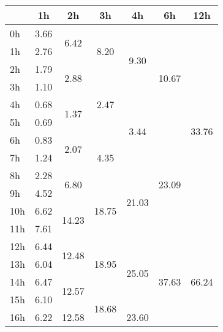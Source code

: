 \begin{center}
\begin{tabular}{l || c | c | c | c | c | c |}\hline
 & 1h & 2h & 3h & 4h & 6h & 12h \\\hline
0h & \multirow{1}{*}{ 3.66 }  & \multirow{2}{*}{ 6.42 }  & \multirow{3}{*}{ 8.20 }  & \multirow{4}{*}{ 9.30 }  & \multirow{6}{*}{ 10.67 }  & \multirow{12}{*}{ 33.76 }  \\\cline{1-1}
1h & \multirow{1}{*}{ 2.76 }  & & & & & \\\cline{1-1}\cline{2-2}
2h & \multirow{1}{*}{ 1.79 }  & \multirow{2}{*}{ 2.88 }  & & & & \\\cline{1-1}\cline{3-3}
3h & \multirow{1}{*}{ 1.10 }  & & \multirow{3}{*}{ 2.47 }  & & & \\\cline{1-1}\cline{2-2}\cline{4-4}
4h & \multirow{1}{*}{ 0.68 }  & \multirow{2}{*}{ 1.37 }  & & \multirow{4}{*}{ 3.44 }  & & \\\cline{1-1}
5h & \multirow{1}{*}{ 0.69 }  & & & & & \\\cline{1-1}\cline{2-2}\cline{3-3}\cline{5-5}
6h & \multirow{1}{*}{ 0.83 }  & \multirow{2}{*}{ 2.07 }  & \multirow{3}{*}{ 4.35 }  & & \multirow{6}{*}{ 23.09 }  & \\\cline{1-1}
7h & \multirow{1}{*}{ 1.24 }  & & & & & \\\cline{1-1}\cline{2-2}\cline{4-4}
8h & \multirow{1}{*}{ 2.28 }  & \multirow{2}{*}{ 6.80 }  & & \multirow{4}{*}{ 21.03 }  & & \\\cline{1-1}\cline{3-3}
9h & \multirow{1}{*}{ 4.52 }  & & \multirow{3}{*}{ 18.75 }  & & & \\\cline{1-1}\cline{2-2}
10h & \multirow{1}{*}{ 6.62 }  & \multirow{2}{*}{ 14.23 }  & & & & \\\cline{1-1}
11h & \multirow{1}{*}{ 7.61 }  & & & & & \\\cline{1-1}\cline{2-2}\cline{3-3}\cline{4-4}\cline{5-5}\cline{6-6}
12h & \multirow{1}{*}{ 6.44 }  & \multirow{2}{*}{ 12.48 }  & \multirow{3}{*}{ 18.95 }  & \multirow{4}{*}{ 25.05 }  & \multirow{6}{*}{ 37.63 }  & \multirow{12}{*}{ 66.24 }  \\\cline{1-1}
13h & \multirow{1}{*}{ 6.04 }  & & & & & \\\cline{1-1}\cline{2-2}
14h & \multirow{1}{*}{ 6.47 }  & \multirow{2}{*}{ 12.57 }  & & & & \\\cline{1-1}\cline{3-3}
15h & \multirow{1}{*}{ 6.10 }  & & \multirow{3}{*}{ 18.68 }  & & & \\\cline{1-1}\cline{2-2}\cline{4-4}
16h & \multirow{1}{*}{ 6.22 }  & \multirow{2}{*}{ 12.58 }  & & \multirow{4}{*}{ 23.60 }  & & \\\cline{1-1}

\end{tabular}
\end{center}
